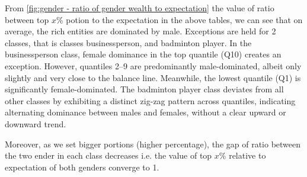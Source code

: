 From \autoref{fig:gender - ratio of gender wealth to expectation} the value of ratio between top \(x\)\% potion to the expectation in the above tables, we can see that on average, the rich entities are dominated by male. Exceptions are held for 2 classes, that is classes businessperson, and badminton player. In the businessperson class, female dominance in the top quantile (Q10) creates an exception. However, quantiles 2–9 are predominantly male-dominated, albeit only slightly and very close to the balance line. Meanwhile, the lowest quantile (Q1) is significantly female-dominated. The badminton player class deviates from all other classes by exhibiting a distinct zig-zag pattern across quantiles, indicating alternating dominance between males and females, without a clear upward or downward trend.

Moreover, as we set bigger portions (higher percentage), the gap of ratio between the two ender in each class decreases i.e. the value of top \(x\)\% relative to expectation of both genders converge to 1.